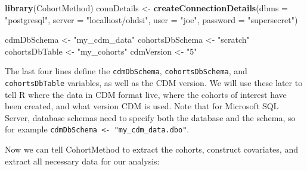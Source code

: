 \documentclass[11pt]{book}
\newenvironment{Shaded}{\begin{snugshade}}{\end{snugshade}}
\newcommand{\KeywordTok}[1]{\textcolor[rgb]{0.13,0.29,0.53}{\textbf{#1}}}
\newcommand{\DataTypeTok}[1]{\textcolor[rgb]{0.13,0.29,0.53}{#1}}
\newcommand{\StringTok}[1]{\textcolor[rgb]{0.31,0.60,0.02}{#1}}
\newcommand{\NormalTok}[1]{#1}
\begin{document}
\begin{Shaded}
\begin{Highlighting}[]
\KeywordTok{library}\NormalTok{(CohortMethod)}
\NormalTok{connDetails <-}\StringTok{ }\KeywordTok{createConnectionDetails}\NormalTok{(}\DataTypeTok{dbms =} \StringTok{"postgresql"}\NormalTok{,}
                                       \DataTypeTok{server =} \StringTok{"localhost/ohdsi"}\NormalTok{,}
                                       \DataTypeTok{user =} \StringTok{"joe"}\NormalTok{,}
                                       \DataTypeTok{password =} \StringTok{"supersecret"}\NormalTok{)}

\NormalTok{cdmDbSchema <-}\StringTok{ "my_cdm_data"}
\NormalTok{cohortsDbSchema <-}\StringTok{ "scratch"}
\NormalTok{cohortsDbTable <-}\StringTok{ "my_cohorts"}
\NormalTok{cdmVersion <-}\StringTok{ "5"}
\end{Highlighting}
\end{Shaded}

The last four lines define the \texttt{cdmDbSchema},
\texttt{cohortsDbSchema}, and \texttt{cohortsDbTable} variables, as well
as the CDM version. We will use these later to tell R where the data in
CDM format live, where the cohorts of interest have been created, and
what version CDM is used. Note that for Microsoft SQL Server, database
schemas need to specify both the database and the schema, so for example
\texttt{cdmDbSchema\ \textless{}-\ "my\_cdm\_data.dbo"}.

Now we can tell CohortMethod to extract the cohorts, construct
covariates, and extract all necessary data for our analysis:
\end{document}
